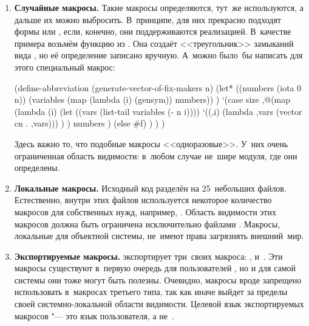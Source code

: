 \begin{enumerate}
  \item \textbf{Случайные макросы.} Такие макросы определяются, тут~же
        используются, а дальше их можно выбросить. В~принципе, для них
        прекрасно подходят формы  или , если,
        конечно, они поддерживаются реализацией. В~качестве примера
        возьмём функцию  из {\Meroonet}. Она создаёт
        <<треугольник>> замыканий вида , но её определение записано вручную.
        А~можно было~бы написать для этого специальный макрос:

\begin{code:lisp}
(define-abbreviation (generate-vector-of-fix-makers n)
  (let* ((numbers (iota 0 n))
         (variables (map (lambda (i) (gensym)) numbers)) )
    `(case size
       ,@(map (lambda (i)
                (let ((vars (list-tail variables (- n i))))
                  `((,i) (lambda ,vars (vector cn . ,vars))) ) )
              numbers )
       (else #f) ) ) )
\end{code:lisp}
        
        \noindent
        Здесь важно то, что подобные макросы <<одноразовые>>. У~них
        очень ограниченная область видимости: в~любом случае не~шире
        модуля, где они определены.

  \item \textbf{Локальные макросы.} Исходный код {\Meroon} разделён на
        25~небольших файлов. Естественно, внутри этих файлов используется
        некоторое количество макросов для собственных нужд, например,
        . Область видимости этих макросов должна быть ограничена
        исключительно файлами {\Meroon}. Макросы, локальные для объектной
        системы, не~имеют права загрязнять внешний~мир.

  \item \textbf{Экспортируемые макросы.} {\Meroon} экспортирует три~своих
        макроса: ,  и~.
        Эти макросы существуют в~первую очередь для пользователей {\Meroon},
        но и для самой системы они тоже могут быть полезны. Очевидно,
        макросы вроде  запрещено использовать в~макросах третьего
        типа, так как иначе  выйдет за пределы своей
        системно-локальной области видимости. Целевой язык экспортируемых
        макросов "--- это язык пользователя, а не~{\Meroon}.
\end{enumerate}

